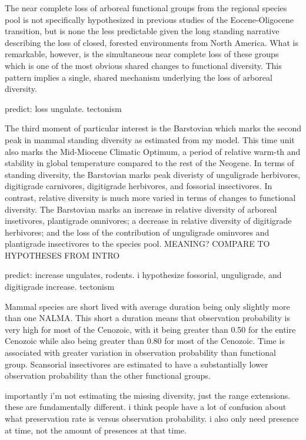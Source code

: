 \documentclass[12pt,letterpaper]{article}
\begin{document}
The near complete loss of arboreal functional groups from the regional species pool is not specifically hypothesized in previous studies of the Eocene-Oligocene transition, but is none the less predictable given the long standing narrative describing the loss of closed, forested environments from North America. What is remarkable, however, is the simultaneous near complete loss of these groups which is one of the most obvious shared changes to functional diversity. This pattern implies a single, shared mechanism underlying the loss of arboreal diversity.

predict: loss ungulate. tectonism




The third moment of particular interest is the Barstovian which marks the second peak in mammal standing diversity as estimated from my model. This time unit also marks the Mid-Miocene Climatic Optimum, a period of relative warm-th and stability in global temperature compared to the rest of the Neogene. In terms of standing diversity, the Barstovian marks peak diveristy of unguligrade herbivores, digitigrade carnivores, digitigrade herbivores, and fossorial insectivores. In contrast, relative diversity is much more varied in terms of changes to functional diversity. The Barstovian marks an increase in relative diversity of arboreal insetivores, plantigrade omnivores; a decrease in relative diversity of digitigrade herbivores; and the loss of the contribution of unguligrade ominvores and plantigrade insectivores to the species pool. \uppercase{meaning? compare to hypotheses from intro}

predict: increase ungulates, rodents. i hypothesize fossorial, unguligrade, and digitigrade increase. tectonism



Mammal species are short lived with average duration being only slightly more than one NALMA. This short a duration means that observation probability is very high for most of the Cenozoic, with it being greater than 0.50 for the entire Cenozoic while also being greater than 0.80 for most of the Cenozoic. Time is associated with greater variation in observation probability than functional group. Scansorial insectivores are estimated to have a substantially lower observation probability than the other functional groups.

importantly i'm not estimating the missing diversity, just the range extensions. these are fundamentally different. i think people have a lot of confusion about what preservation rate is versus observation probability. i also only need presence at time, not the amount of presences at that time.
\end{document}
